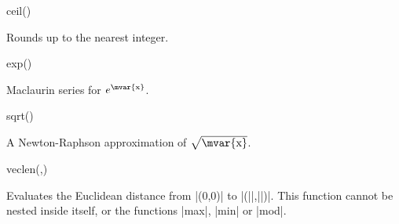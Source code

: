 \begin{math-function}{ceil()}

	Rounds  up to the nearest integer. 

\begin{codeexample}[post=\tt\footnotesize\pgfmathresult]
\end{codeexample}

\begin{codeexample}[post=\tt\footnotesize\pgfmathresult]
\end{codeexample}

\end{math-function}

\begin{math-function}{exp()}

	Maclaurin series for $e^\textrm{\mvar{x}}$. 
	
\begin{codeexample}[post=\tt\footnotesize\pgfmathresult]
\end{codeexample}

\begin{codeexample}[post=\tt\footnotesize\pgfmathresult]
\end{codeexample}

\end{math-function}

\begin{math-function}{sqrt()}

 A Newton-Raphson approximation of $\sqrt{\textrm{\mvar{x}}}$.  

\begin{codeexample}[post=\tt\footnotesize\pgfmathresult]
\end{codeexample}

\begin{codeexample}[post=\tt\footnotesize\pgfmathresult]
\end{codeexample}


\end{math-function}

\begin{math-function}{veclen(,)}

	Evaluates the Euclidean distance from |(0,0)| to |(||,||)|. 
	This function cannot be nested inside itself, or the functions |max|,
	|min| or |mod|.

\begin{codeexample}[post=\tt\footnotesize\pgfmathresult]
\end{codeexample}

\begin{codeexample}[post=\tt\footnotesize\pgfmathresult]
\end{codeexample}

\end{math-function}


